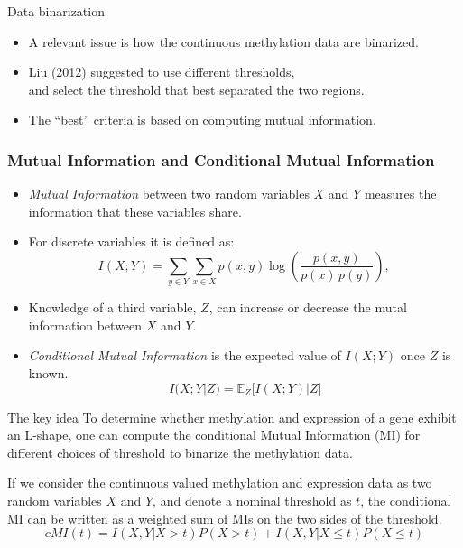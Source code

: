 \documentclass[handout]{beamer}
\begin{document}
\begin{frame}{Data binarization}
\begin{itemize}
\item A relevant issue is how the continuous methylation data are binarized.
\item Liu (2012) suggested to use different thresholds,\\
 and select the threshold that best separated the two regions.
\item The ``best'' criteria is based on computing mutual information.
\end{itemize}

\end{frame}



\begin{frame}[allowframebreaks]
\frametitle{Mutual Information and Conditional Mutual Information}
\begin{itemize}
\item   \emph{Mutual Information} between two random variables $X$
and $Y$ measures the information that these variables share.
\item For discrete variables it is defined as:
\[
 I(X;Y)= \sum_{y \in Y} \sum_{x \in X}
                 p(x,y) \log{ \left(\frac{p(x,y)}{p(x)\,p(y)}
                              \right) }, \,\!
\]
\item Knowledge of a third variable, $Z$, can increase or decrease the mutal
information between $X$ and $Y$.
\item \emph{Conditional Mutual Information} is the expected value of $I(X;Y)$ once $Z$ is
known.
\[
I(X;Y|Z) = \mathbb E_Z \big[ I(X;Y)|Z\big ]
\]
\end{itemize}

\framebreak

\begin{block}{The key idea}
To determine whether methylation and expression of a gene exhibit an L-shape,
one can compute the conditional Mutual Information (MI) for different choices of threshold
to binarize the methylation data.
\end{block}
If we consider the continuous valued methylation and expression data as two random variables
$X$ and $Y$, and denote a nominal threshold as $t$, the conditional MI can be written as a
weighted sum of MIs on the two sides of the threshold.
\[
\mathit{cMI}(t)=I(X,Y|X>t) P(X>t) + I(X,Y|X\le t)P(X\le t)
\]
\end{frame}
\end{document}
